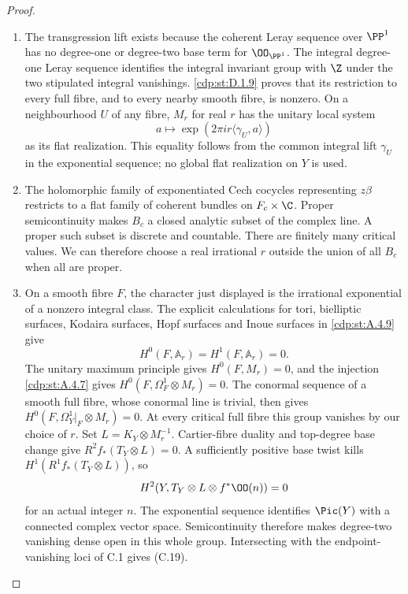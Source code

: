 \begin{proof}

\begin{enumerate}[label={$\langle1\rangle$\arabic*.},leftmargin=*]
\item The transgression lift exists because the coherent Leray sequence over $\PP^1$ has no degree-one or degree-two base term for $\OO_{\PP^1}$. The integral degree-one Leray sequence identifies the integral invariant group with $\Z$ under the two stipulated integral vanishings. \ref{cdp:st:D.1.9} proves that its restriction to every full fibre, and to every nearby smooth fibre, is nonzero. On a neighbourhood $U$ of any fibre, $M_r$ for real $r$ has the unitary local system
\[
 a\longmapsto\exp(2\pi i r\langle\gamma_U,a\rangle)
\]
as its flat realization. This equality follows from the common integral lift $\gamma_U$ in the exponential sequence; no global flat realization on $Y$ is used.

\item The holomorphic family of exponentiated Cech cocycles representing $z\beta$ restricts to a flat family of coherent bundles on $F_c\times\C$. Proper semicontinuity makes $B_c$ a closed analytic subset of the complex line. A proper such subset is discrete and countable. There are finitely many critical values. We can therefore choose a real irrational $r$ outside the union of all $B_c$ when all are proper.

\item On a smooth fibre $F$, the character just displayed is the irrational exponential of a nonzero integral class. The explicit calculations for tori, bielliptic surfaces, Kodaira surfaces, Hopf surfaces and Inoue surfaces in \ref{cdp:st:A.4.9} give
\[
 H^0(F,\mathbb A_r)=H^1(F,\mathbb A_r)=0.
\]
The unitary maximum principle gives $H^0(F,M_r)=0$, and the injection \ref{cdp:st:A.4.7} gives $H^0(F,\Omega_F^1\otimes M_r)=0$. The conormal sequence of a smooth full fibre, whose conormal line is trivial, then gives
$H^0(F,\Omega_Y^1|_F\otimes M_r)=0$.
At every critical full fibre this group vanishes by our choice of $r$. Set $L=K_Y\otimes M_r^{-1}$. Cartier-fibre duality and top-degree base change give $R^2f_*(T_Y\otimes L)=0$. A sufficiently positive base twist kills $H^1(R^1f_*(T_Y\otimes L))$, so
\[
 H^2(Y,T_Y\otimes L\otimes f^*\OO(n))=0
\]
for an actual integer $n$. The exponential sequence identifies $\Pic(Y)$ with a connected complex vector space. Semicontinuity therefore makes degree-two vanishing dense open in this whole group. Intersecting with the endpoint-vanishing loci of C.1 gives (C.19).


\end{enumerate}
\end{proof}
